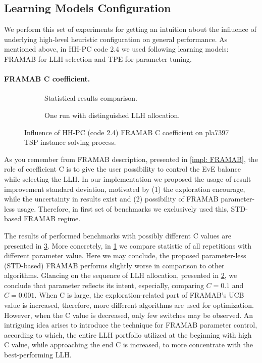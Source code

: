\subsection{Learning Models Configuration}\label{eval:2:learning models}
We perform this set of experiments for getting an intuition about the influence of underlying high-level heuristic configuration on general performance. As mentioned above, in HH-PC code 2.4 we used following learning models: FRAMAB for LLH selection and TPE for parameter tuning.

\paragraph{FRAMAB C coefficient.}
\begin{figure}[h]
	\centering
	\begin{subfigure}{\textwidth}
		\vspace{-10pt}
		
		\caption{Statistical results comparison.}
		\label{eval:2:pict:framab c statistic}
	\end{subfigure}
	\begin{subfigure}{\textwidth}
		
		\vspace{-5pt}
		\caption{One run with distinguished LLH allocation.}
		\label{eval:2:pict:framab c one run}
	\end{subfigure}
	\caption{Influence of HH-PC (code 2.4) FRAMAB C coefficient on pla7397 TSP instance solving process.}
	\label{eval:2:pict:framab c}
\end{figure}

As you remember from FRAMAB description, presented in \cref{impl: FRAMAB}, the role of coefficient C is to give the user possibility to control the EvE balance while selecting the LLH. In our implementation we proposed the usage of result improvement standard deviation, motivated by (1) the exploration encourage, while the uncertainty in results exist and (2) possibility of FRAMAB parameter-less usage. Therefore, in first set of benchmarks we exclusively used this, STD-based FRAMAB regime.

The results of performed benchmarks with possibly different C values are presented in \cref{eval:2:pict:framab c}. More concretely, in \cref{eval:2:pict:framab c statistic} we compare statistic of all repetitions with different parameter value. Here we may conclude, the proposed parameter-less (STD-based) FRAMAB performs slightly worse in comparison to other algorithms. Glancing on the sequence of LLH allocation, presented in \cref{eval:2:pict:framab c one run}, we conclude that parameter reflects its intent, especially, comparing $C=0.1$ and $C=0.001$. When C is large, the exploration-related part of FRAMAB's UCB value is increased, therefore, more different algorithms are used for optimization. However, when the C value is decreased, only few switches may be observed. An intriguing idea arises to introduce the technique for FRAMAB parameter control, according to which, the entire LLH portfolio utilized at the beginning with high C value, while approaching the end C is increased, to more concentrate with the best-performing LLH.

